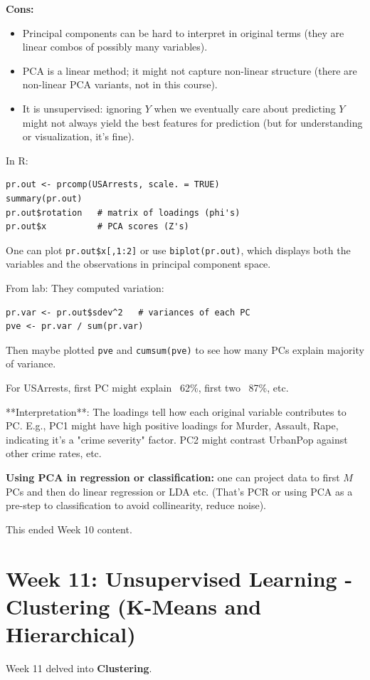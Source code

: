 \documentclass[11pt]{article}
\begin{document}
\noindent \textbf{Cons:}
\begin{itemize}
    \item Principal components can be hard to interpret in original terms (they are linear combos of possibly many variables).
    \item PCA is a linear method; it might not capture non-linear structure (there are non-linear PCA variants, not in this course).
    \item It is unsupervised: ignoring $Y$ when we eventually care about predicting $Y$ might not always yield the best features for prediction (but for understanding or visualization, it's fine).
\end{itemize}

\noindent In R:
\begin{verbatim}
pr.out <- prcomp(USArrests, scale. = TRUE)
summary(pr.out)
pr.out$rotation   # matrix of loadings (phi's)
pr.out$x          # PCA scores (Z's)
\end{verbatim}
One can plot \texttt{pr.out\$x[,1:2]} or use \texttt{biplot(pr.out)}, which displays both the variables and the observations in principal component space.

From lab:
They computed variation:
\begin{verbatim}
pr.var <- pr.out$sdev^2   # variances of each PC
pve <- pr.var / sum(pr.var)
\end{verbatim}
Then maybe plotted \texttt{pve} and \texttt{cumsum(pve)} to see how many PCs explain majority of variance.

For USArrests, first PC might explain ~62\%, first two ~87\%, etc.

**Interpretation**: The loadings tell how each original variable contributes to PC. E.g., PC1 might have high positive loadings for Murder, Assault, Rape, indicating it's a "crime severity" factor. PC2 might contrast UrbanPop against other crime rates, etc.

\textbf{Using PCA in regression or classification:} one can project data to first $M$ PCs and then do linear regression or LDA etc. (That's PCR or using PCA as a pre-step to classification to avoid collinearity, reduce noise).

This ended Week 10 content.

\section{Week 11: Unsupervised Learning - Clustering (K-Means and Hierarchical)}
Week 11 delved into \textbf{Clustering}.
\end{document}
